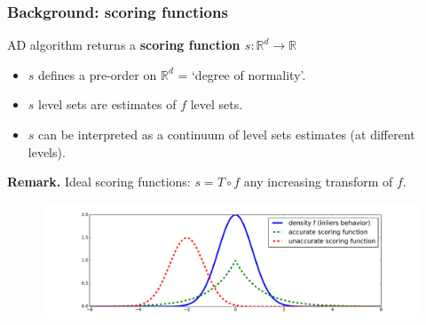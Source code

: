 \documentclass[9pt]{beamer}
\newcommand\blue{\color{blue} }
\newcommand\green{\color{green} }
\begin{document}
\begin{frame}
\begin{itemize}

\end{itemize}
\end{frame}


\begin{frame}
\frametitle{Background: scoring functions}

\begin{block}{AD algorithm returns a \textbf{scoring function {\green $s: \mathbb{R}^d \to \mathbb{R}$}}}

\begin{itemize}
\item {\green $s$} defines a {\green pre-order} on $\mathbb{R}^d$ = `degree of normality'.\\
\item {\green $s$} level sets are estimates of $f$ level sets.\\
\item {\green $s$} can be interpreted as a {\green continuum of level sets estimates} (at different levels).
\end{itemize}
\end{block}
{\small
\textbf{Remark.} Ideal scoring functions: %
{\green $s=T \circ f$} any increasing transform of $f$.
}
%
\begin{figure}[htb]
\centering
\includegraphics[width=1.01\columnwidth]{sourcefigs/scoring.pdf}
\end{figure}

\end{frame}
\end{document}
